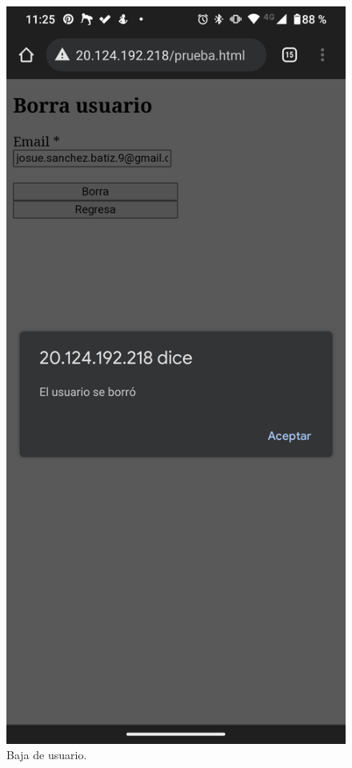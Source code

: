 \documentclass[11pt]{article}
\begin{document}
		\begin{figure}[H]
			\centering
			\includegraphics[scale=0.18]{resources/Screenshot_20211219-232548.png}
			\caption{Baja de usuario.}\label{fig:picture}
		\end{figure}
\end{document}

